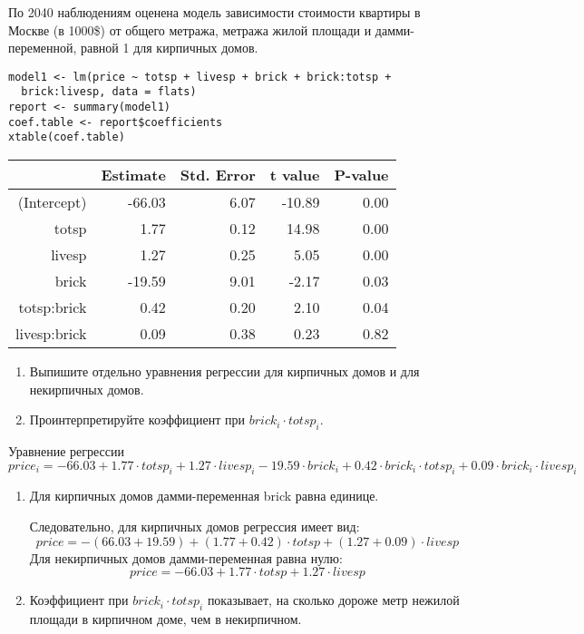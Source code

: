 \begin{problem} %
По 2040 наблюдениям оценена модель зависимости стоимости квартиры в Москве (в 1000\$) от общего метража, метража жилой площади и дамми-переменной, равной 1 для кирпичных домов.
\begin{verbatim}
model1 <- lm(price ~ totsp + livesp + brick + brick:totsp +
  brick:livesp, data = flats)
report <- summary(model1)
coef.table <- report$coefficients
xtable(coef.table)
\end{verbatim}


\begin{tabular}{rrrrr}
  \hline
 & Estimate & Std. Error & t value & P-value \\
  \hline
(Intercept) & -66.03 & 6.07 & -10.89 & 0.00 \\
  totsp & 1.77 & 0.12 & 14.98 & 0.00 \\
  livesp & 1.27 & 0.25 & 5.05 & 0.00 \\
  brick & -19.59 & 9.01 & -2.17 & 0.03 \\
  totsp:brick & 0.42 & 0.20 & 2.10 & 0.04 \\
  livesp:brick & 0.09 & 0.38 & 0.23 & 0.82 \\
   \hline
\end{tabular}



\begin{enumerate}
\item Выпишите отдельно уравнения регрессии для кирпичных домов и для некирпичных домов.
\item Проинтерпретируйте коэффициент при $brick_i \cdot totsp_i$.
\end{enumerate}


\begin{sol}

Уравнение регрессии 
\[
price_i = -66.03 + 1.77\cdot totsp_i + 1.27\cdot livesp_i - 19.59\cdot brick_i + 
0.42\cdot brick_i\cdot totsp_i + 0.09\cdot brick_i\cdot livesp_i
\]

\begin{enumerate}
  \item  Для кирпичных домов дамми-переменная brick равна единице. 
  
  Следовательно, для кирпичных домов регрессия имеет вид: 
  \[
  price = -(66.03+19.59) + (1.77+0.42)\cdot totsp + (1.27+0.09)\cdot livesp 
  \]
  Для некирпичных домов дамми-переменная равна нулю: 
  \[
  price = -66.03 + 1.77\cdot totsp + 1.27\cdot livesp
  \]
  
  
\item  Коэффициент при $brick_i \cdot totsp_i$ показывает,
на сколько дороже метр нежилой площади в кирпичном доме, чем в некирпичном.
\end{enumerate}
  

\end{sol}
\end{problem}




